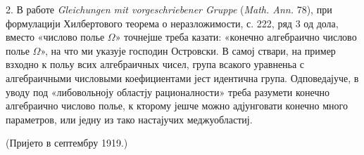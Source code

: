 \documentclass[11pt]{article}
\begin{document}
2. В работе \emph{Gleichungen mit vorgeschriebener Gruppe} (\emph{Math. Ann.} 78), при формулацији Хилбертового теорема о неразложимости, с. 222, ряд 3 од дола, вместо «числово полье \(\Omega\)» точнејше треба казати: «конечно алгебраично числово полье \(\Omega\)», на что ми указује господин Островски. В самој ствари, на пример взходно к польу всих алгебраичных чисел, група всакого уравненьа с алгебраичными числовыми коефициентами јест идентична група. Одповедајуче, в уводу под «либовольноју областју рационалности» треба разумети конечно алгебраично числово полье, к кторому јешче можно адјунговати конечно много параметров, или једну из тако настајучих меджуобластиј.

\begin{center}
(Пријето в септембру 1919.)
\end{center}
\end{document}
